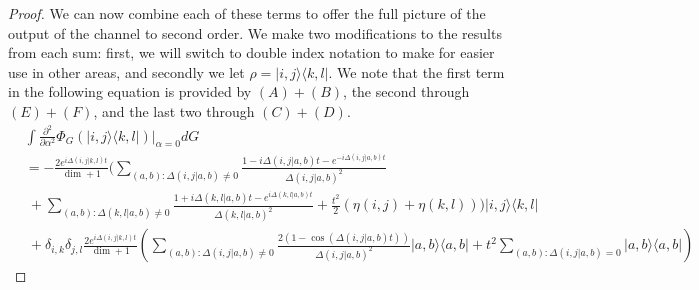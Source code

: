 \documentclass{article}
\newcommand{\ketbra}[2]{| #1\rangle\! \langle #2|}
\newcommand{\parens}[1]{\left( #1 \right)}
\begin{document}
\begin{proof}
 We can now combine each of these terms to offer the full picture of the output of the channel to second order. We make two modifications to the results from each sum: first, we will switch to double index notation to make for easier use in other areas, and secondly we let $\rho = \ketbra{i,j}{k,l}$. We note that the first term in the following equation is provided by $(A) + (B)$, the second through $(E) + (F)$, and the last two through $(C) + (D)$. 
 \begin{align}
     &\int \frac{\partial^2}{\partial \alpha^2} \Phi_G(\ketbra{i,j}{k,l})\bigg|_{\alpha = 0} dG \\
     &= -\frac{2  e^{i \Delta(i,j|k,l) t}}{\dim + 1} \bigg(\sum_{(a,b): \Delta(i,j|a,b) \neq 0} \frac{1 - i \Delta(i,j|a,b)t - e^{-i \Delta(i,j|a,b) t}}{\Delta(i,j|a,b)^2} \nonumber \\
     &~+ \sum_{(a,b): \Delta(k,l|a,b) \neq 0} \frac{1 + i \Delta(k,l|a,b) t - e^{i \Delta(k,l|a,b) t}}{\Delta(k,l|a,b)^2} + \frac{t^2}{2}(\eta(i,j) + \eta(k,l)) \bigg) \ketbra{i,j}{k,l} \nonumber \\
    &~ +\delta_{i,k} \delta_{j,l} \frac{2 e^{i \Delta(i,j|k,l)t}}{\dim+1} \parens{ \sum_{(a,b): \Delta(i,j|a,b) \neq 0 } \frac{2(1- \cos (\Delta(i,j|a,b)t))}{\Delta(i,j|a,b)^2} \ketbra{a,b}{a,b} + t^2 \sum_{(a,b) : \Delta(i,j|a,b) = 0} \ketbra{a,b}{a,b}} \label{eq:second_order_output}
 \end{align}
\end{proof}
\end{document}
